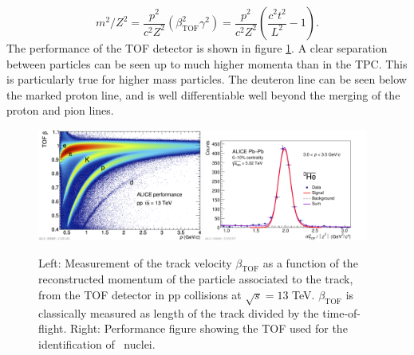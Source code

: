 \begin{equation}\label{eq:TOFm2}
    m^2/Z^2 = \frac{p^2}{c^2 Z^2}\left(\beta_{\mathrm{TOF}}^2\gamma^2 \right) = \frac{p^2}{c^2 Z^2} \left( \frac{c^2t^2}{L^2} -1\right).
\end{equation}
The performance of the TOF detector is shown in figure \ref{fig:TOF_performance}. A clear separation between particles can be seen up to much higher momenta than in the TPC. This is particularly true for higher mass particles. The deuteron line can be seen below the marked proton line, and is well differentiable well beyond the merging of the proton and pion lines. 

\begin{figure}
    \centering
    \includegraphics[width=0.48\textwidth]{figures/2016-Sep-08-beta.png}
    \includegraphics[width=0.48\textwidth]{figures/triton/anti3he_tofm2_seminar.png}
    \caption{Left: Measurement of the track velocity $\beta_{\mathrm{TOF}}$ as a function of the reconstructed momentum of the particle associated to the track, from the TOF detector in pp collisions at $\sqrt{s}=13$ TeV. $\beta_{\mathrm{TOF}}$ is classically measured as length of the track divided by the time-of-flight. Right: Performance figure showing the TOF used for the identification of \ahe\ nuclei.}
    \label{fig:TOF_performance}
\end{figure}



